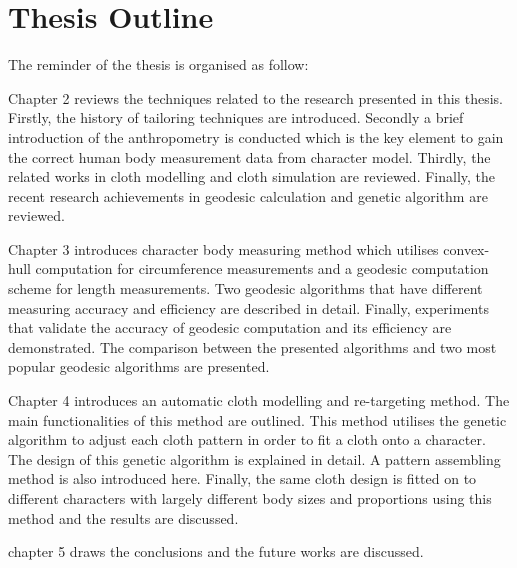 \section{Thesis Outline}
The reminder of the thesis is organised as follow:

Chapter 2 reviews the techniques related to the research presented in this thesis. Firstly, the history of tailoring techniques are introduced. Secondly a brief introduction of the anthropometry is conducted which is the key element to gain the correct human body measurement data from character model. Thirdly, the related works in cloth modelling and cloth simulation are reviewed. Finally, the recent research achievements in geodesic calculation and genetic algorithm are reviewed.

Chapter 3 introduces character body measuring method which utilises convex-hull computation for circumference measurements and a geodesic computation scheme for length measurements. Two geodesic algorithms that have different measuring accuracy and efficiency are described in detail. Finally, experiments that validate the accuracy of geodesic computation and its efficiency are demonstrated. The comparison between the presented algorithms and two most popular geodesic algorithms are presented. 

Chapter 4 introduces an automatic cloth modelling and re-targeting method.  The main functionalities of this method are outlined. This method utilises the genetic algorithm to adjust each cloth pattern in order to fit a cloth onto a character. The design of this genetic algorithm is explained in detail. A pattern assembling method is also introduced here. Finally, the same cloth design is fitted on to different characters with largely different body sizes and proportions using this method and the results are discussed. 

chapter 5 draws the conclusions and the future works are discussed. 



\ifx\isEmbedded\undefined


\pagebreak

\fi
